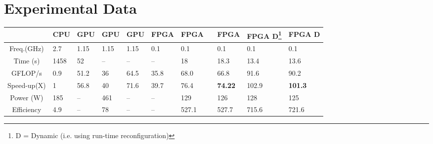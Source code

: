 \documentclass[a4paper, 11]{article}
\begin{document}
\clearpage

\pgfplotsset{width=0.7\textwidth, enlargelimits=0.15}

\renewcommand{\arraystretch}{1.5}


%





\clearpage
\appendix
\section{Experimental Data}
\label{sec:appendix}

\begin{table}[!ht]
{\small
  \renewcommand{\arraystretch}{1.5}
  \begin{tabularx}{\linewidth}{c|X|X|X|X|X|X|X|X|X}
    & \textbf{CPU} & \textbf{GPU} \cite{phillips2010implementing} & \textbf{GPU} \cite{datta2008stencil} & \textbf{GPU} \cite{yang2012hybrid}& \textbf{FPGA} \cite{araya2011assessing} & \textbf{FPGA} \cite{Xinyu:Qiwei:Luk:Qiang:Pell:2012} \ & \textbf{FPGA} & \textbf{FPGA D\footnote{D = Dynamic (i.e. using run-time reconfiguration)}} \cite{Xinyu:Qiwei:Luk:Qiang:Pell:2012} & \textbf{FPGA D} \\
    \hline \hline
    Freq.(GHz) & 2.7          & 1.15         &    1.15          &   1.15           &    0.1           & 0.1                 & 0.1                 & 0.1                 & 0.1                 \\
    Time (s)   & 1458         & 52           &    --          &     --         &    --           & 18                  & 18.3                & 13.4                & 13.6                \\
    GFLOP/s    & 0.9          & 51.2         &    36          &     64.5         &    35.8          & 68.0                & 66.8                & 91.6                & 90.2                \\
    Speed-up(X)   & 1           & 56.8        &   40          &     71.6         &     39.7          & 76.4               & \textbf{74.22}     & 102.9              & \textbf{101.3}     \\
    Power (W)  & 185          & --        &    461          &      --        &         --      & 129                 & 126                 & 128                 & 125                 \\
    Efficiency & 4.9          & --        &    78          &       --       &    --           & 527.1               & 527.7               & 715.6               & 721.6               \\

\end{tabularx}}
\end{table}
\end{document}
